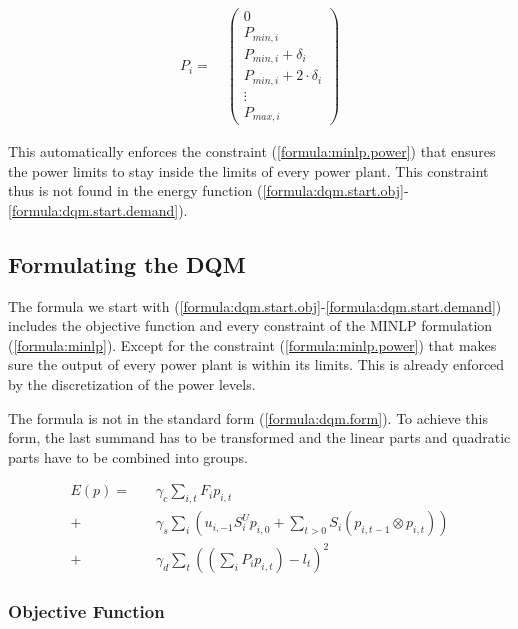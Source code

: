 \begin{align}
  P_i =
  \quad \begin{pmatrix}
    0 \\
    P_{min, i} \\
    P_{min, i} + \delta_i \\
    P_{min, i} + 2 \cdot \delta_i \\
    \vdots \\
    P_{max, i}
  \end{pmatrix}
\end{align}

This automatically enforces the constraint (\ref{formula:minlp.power}) that ensures the power limits to stay inside the limits of every power plant.
This constraint thus is not found in the energy function (\ref{formula:dqm.start.obj}-\ref{formula:dqm.start.demand}).

\subsection{Formulating the DQM}

The formula we start with (\ref{formula:dqm.start.obj}-\ref{formula:dqm.start.demand})
includes the objective function and every constraint of the MINLP formulation (\ref{formula:minlp}).
Except for the constraint (\ref{formula:minlp.power}) that makes sure the output of every power plant is within its limits.
This is already enforced by the discretization of the power levels.

The formula is not in the standard form (\ref{formula:dqm.form}).
To achieve this form, the last summand has to be transformed and the linear parts and quadratic parts have to be combined into groups.

\begin{subequations}
\begin{align}
  E(p) =
  &  \quad \gamma_c \sum_{i, t} F_i p_{i, t}
  \label{formula:dqm.start.obj} \\
  + & \quad \gamma_s \sum_i \left(
      u_{i, -1} S_i^U p_{i, 0}
      + \sum_{t > 0} S_i \left( p_{i, t-1} \otimes p_{i, t} \right)
    \right)
  \label{formula:dqm.start.startup} \\
  + & \quad \gamma_d \sum_t \left( \left( \sum_i P_i p_{i, t} \right) - l_t \right)^2
  \label{formula:dqm.start.demand}
\end{align}
\end{subequations}

\subsubsection{Objective Function}

